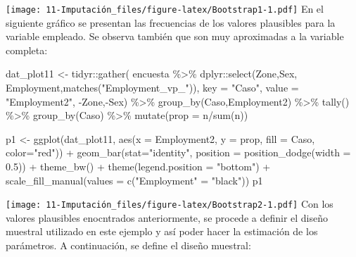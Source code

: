 \documentclass[
  12pt,
]{book}
\newenvironment{Shaded}{\begin{snugshade}}{\end{snugshade}}
\newcommand{\AttributeTok}[1]{\textcolor[rgb]{0.77,0.63,0.00}{#1}}
\newcommand{\FloatTok}[1]{\textcolor[rgb]{0.00,0.00,0.81}{#1}}
\newcommand{\FunctionTok}[1]{\textcolor[rgb]{0.00,0.00,0.00}{#1}}
\newcommand{\NormalTok}[1]{#1}
\newcommand{\OtherTok}[1]{\textcolor[rgb]{0.56,0.35,0.01}{#1}}
\newcommand{\SpecialCharTok}[1]{\textcolor[rgb]{0.00,0.00,0.00}{#1}}
\newcommand{\StringTok}[1]{\textcolor[rgb]{0.31,0.60,0.02}{#1}}
\begin{document}
\texttt{[image: 11-Imputación\_files/figure-latex/Bootstrap1-1.pdf]}
En el siguiente gráfico se presentan las frecuencias de los valores plausibles para la variable empleado. Se observa también que son muy aproximadas a la variable completa:

\begin{Shaded}
\begin{Highlighting}[]
\NormalTok{dat\_plot11 }\OtherTok{\textless{}{-}}\NormalTok{ tidyr}\SpecialCharTok{::}\FunctionTok{gather}\NormalTok{(}
\NormalTok{  encuesta }\SpecialCharTok{\%\textgreater{}\%} 
\NormalTok{  dplyr}\SpecialCharTok{::}\FunctionTok{select}\NormalTok{(Zone,Sex, Employment,}\FunctionTok{matches}\NormalTok{(}\StringTok{"Employment\_vp\_"}\NormalTok{)),}
  \AttributeTok{key =} \StringTok{"Caso"}\NormalTok{, }\AttributeTok{value =} \StringTok{"Employment2"}\NormalTok{, }\SpecialCharTok{{-}}\NormalTok{Zone,}\SpecialCharTok{{-}}\NormalTok{Sex) }\SpecialCharTok{\%\textgreater{}\%}
  \FunctionTok{group\_by}\NormalTok{(Caso,Employment2) }\SpecialCharTok{\%\textgreater{}\%} \FunctionTok{tally}\NormalTok{() }\SpecialCharTok{\%\textgreater{}\%} 
  \FunctionTok{group\_by}\NormalTok{(Caso) }\SpecialCharTok{\%\textgreater{}\%} \FunctionTok{mutate}\NormalTok{(}\AttributeTok{prop =}\NormalTok{ n}\SpecialCharTok{/}\FunctionTok{sum}\NormalTok{(n))}

\NormalTok{p1 }\OtherTok{\textless{}{-}} \FunctionTok{ggplot}\NormalTok{(dat\_plot11, }
        \FunctionTok{aes}\NormalTok{(}\AttributeTok{x =}\NormalTok{ Employment2, }\AttributeTok{y =}\NormalTok{ prop,}
            \AttributeTok{fill =}\NormalTok{ Caso, }\AttributeTok{color=}\StringTok{"red"}\NormalTok{)) }\SpecialCharTok{+} 
       \FunctionTok{geom\_bar}\NormalTok{(}\AttributeTok{stat=}\StringTok{"identity"}\NormalTok{,}
          \AttributeTok{position =} \FunctionTok{position\_dodge}\NormalTok{(}\AttributeTok{width =} \FloatTok{0.5}\NormalTok{))  }\SpecialCharTok{+}
   \FunctionTok{theme\_bw}\NormalTok{() }\SpecialCharTok{+}
   \FunctionTok{theme}\NormalTok{(}\AttributeTok{legend.position =} \StringTok{"bottom"}\NormalTok{) }\SpecialCharTok{+}
  \FunctionTok{scale\_fill\_manual}\NormalTok{(}\AttributeTok{values =} \FunctionTok{c}\NormalTok{(}\StringTok{"Employment"} \OtherTok{=} \StringTok{"black"}\NormalTok{))}
\NormalTok{p1}
\end{Highlighting}
\end{Shaded}

\texttt{[image: 11-Imputación\_files/figure-latex/Bootstrap2-1.pdf]}
Con los valores plausibles enocntrados anteriormente, se procede a definir el diseño muestral utilizado en este ejemplo y así poder hacer la estimación de los parámetros. A continuación, se define el diseño muestral:
\end{document}
